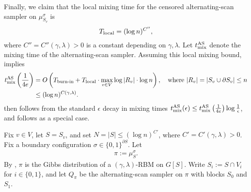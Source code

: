 \documentclass[11pt]{amsart}
\newcommand{\defeq}{:=}
\theoremstyle{definition}
\theoremstyle{remark}
\begin{document}
Finally, we claim that the local mixing time for the censored alternating-scan sampler on $\mu^\sigma_{S_v}$ is 
\begin{align}\label{eq:local-mixing-time-bound-pf-1}
    T_{\textnormal{local}} = (\log n)^{C''},
\end{align}
where $C'' = C''(\gamma,\lambda) > 0$ is a constant depending on $\gamma,\lambda$. 
Let $t_{\textnormal{mix}}^{\textnormal{AS}}$ denote the mixing time of the alternating-scan sampler.
Assuming this local mixing bound,  implies
\begin{align*}
t_{\textnormal{mix}}^{\textnormal{AS}}\left(\frac{1}{4e}\right) &= O\left(T_{\textnormal{burn-in}} + T_{\textnormal{local}} \cdot \max_{v \in V}\log |R_v|\cdot\log n\right), \quad \text{where } |R_v| = |S_v \cup \partial S_v| \leq n\\
&\leq (\log n)^{C(\gamma,\lambda)}.
\end{align*}
 then follows from the standard $\epsilon$ decay in mixing times $t_{\textnormal{mix}}^{\textnormal{AS}}(\epsilon) \leq t_{\textnormal{mix}}^{\textnormal{AS}}\left(\frac{1}{4e}\right)\log \frac{1}{\epsilon}$, and  follows as a special case.

Fix $v \in V$, let $S = S_v$, and set $N = |S| \leq (\log n)^{C'}$, where $C' = C'(\gamma,\lambda) > 0$. Fix a boundary configuration $\sigma \in \{0,1\}^{\partial S}$. Let
\begin{align*}
    \pi \defeq \mu^\sigma_{S}.
\end{align*}
By , $\pi$ is the Gibbs distribution of a $(\gamma,\lambda)$-RBM on $G[S]$. Write $S_i \defeq S \cap V_i$ for $i \in \{0,1\}$, and let $Q_\pi$ be the alternating-scan sampler on $\pi$ with blocks $S_0$ and $S_1$.
\end{document}
